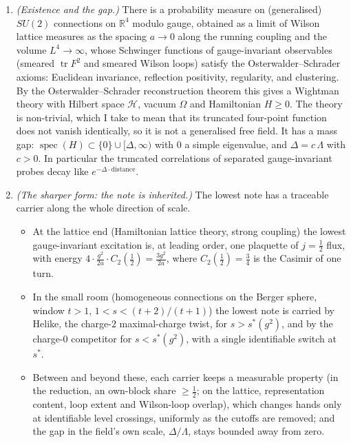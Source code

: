 \begin{mainconj}
\begin{enumerate}[label=(\roman*),leftmargin=18pt,itemsep=2pt,topsep=2pt]
\item \emph{(Existence and the gap.)} There is a probability measure on
(generalised) $SU(2)$ connections on $\mathbb R^4$ modulo gauge, obtained as a
limit of Wilson lattice measures as the spacing $a\to0$ along the running
coupling and the volume $L^4\to\infty$, whose Schwinger functions of
gauge-invariant observables (smeared $\operatorname{tr}F^2$ and smeared Wilson
loops) satisfy the Osterwalder--Schrader axioms: Euclidean invariance,
reflection positivity, regularity, and clustering. By the
Osterwalder--Schrader reconstruction theorem this gives a Wightman theory with
Hilbert space $\mathcal H$, vacuum $\Omega$ and Hamiltonian $H\geq0$. The theory
is non-trivial, which I take to mean that its truncated four-point function
does not vanish identically, so it is not a generalised free field. It has a mass gap:
$\operatorname{spec}(H)\subset\{0\}\cup[\Delta,\infty)$ with $0$ a simple
eigenvalue, and $\Delta=c\,\Lambda$ with $c>0$. In particular the truncated
correlations of separated gauge-invariant probes decay like
$e^{-\Delta\cdot\mathrm{distance}}$.
\item \emph{(The sharper form: the note is inherited.)} The lowest note has a
traceable carrier along the whole direction of scale.
\begin{itemize}[leftmargin=14pt,itemsep=1pt,topsep=1pt]
\item At the lattice end (Hamiltonian lattice theory, strong coupling) the
lowest gauge-invariant excitation is, at leading order, one plaquette of
$j=\tfrac12$ flux, with energy $4\cdot\frac{g^2}{2a}\cdot C_2(\tfrac12)=\frac{3g^2}{2a}$,
where $C_2(\tfrac12)=\tfrac34$ is the Casimir of one turn.
\item In the small room (homogeneous connections on the Berger sphere, window
$t>1$, $1<s<(t+2)/(t+1)$) the lowest note is carried by Helike, the
charge-$2$ maximal-charge twist, for $s>s^*(g^2)$, and by the charge-$0$
competitor for $s<s^*(g^2)$, with a single identifiable switch at $s^*$.
\item Between and beyond these, each carrier keeps a measurable property (in the
reduction, an own-block share $\geq\tfrac12$; on the lattice, representation
content, loop extent and Wilson-loop overlap), which changes hands only at
identifiable level crossings, uniformly as the cutoffs are removed; and the gap
in the field's own scale, $\Delta/\Lambda$, stays bounded away from zero.
\end{itemize}
\end{enumerate}
\end{mainconj}

